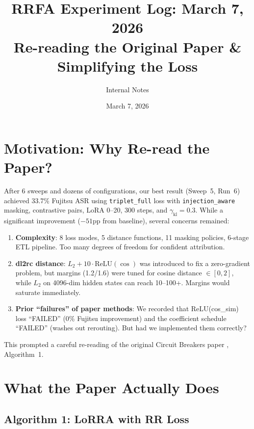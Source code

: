 \documentclass[11pt]{article}
\title{RRFA Experiment Log: March 7, 2026\\
\large Re-reading the Original Paper \& Simplifying the Loss}
\author{Internal Notes}
\date{March 7, 2026}
\begin{document}
\maketitle

\section{Motivation: Why Re-read the Paper?}

After 6 sweeps and dozens of configurations, our best result (Sweep~5, Run~6)
achieved 33.7\% Fujitsu ASR using \texttt{triplet\_full} loss with
\texttt{injection\_aware} masking, contrastive pairs, LoRA 0--20, 300 steps,
and $\gamma_\mathrm{kl}=0.3$. While a significant improvement ($-51$pp from
baseline), several concerns remained:

\begin{enumerate}
  \item \textbf{Complexity}: 8 loss modes, 5 distance functions, 11 masking
        policies, 6-stage ETL pipeline. Too many degrees of freedom for
        confident attribution.
  \item \textbf{dl2rc distance}: $L_2 + 10 \cdot \mathrm{ReLU}(\cos)$ was
        introduced to fix a zero-gradient problem, but margins (1.2/1.6)
        were tuned for cosine distance $\in [0,2]$, while $L_2$ on 4096-dim
        hidden states can reach 10--100+. Margins would saturate immediately.
  \item \textbf{Prior ``failures'' of paper methods}: We recorded that
        ReLU(cos\_sim) loss ``FAILED'' (0\% Fujitsu improvement) and the
        coefficient schedule ``FAILED'' (washes out rerouting). But had we
        implemented them correctly?
\end{enumerate}

This prompted a careful re-reading of the original Circuit Breakers paper
\cite{zou2024circuit}, Algorithm~1.

\section{What the Paper Actually Does}

\subsection{Algorithm 1: LoRRA with RR Loss}
\end{document}
